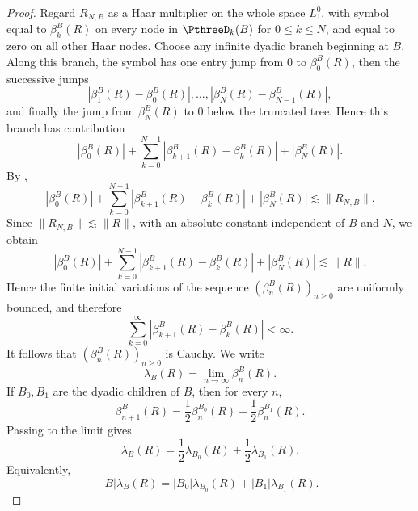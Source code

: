 \documentclass[11pt,reqno]{amsart}
\makeatletter
\theoremstyle{plain}
\theoremstyle{definition}
\newcounter{problempaper}
\newenvironment{problempaperbody}{%
  \setcounter{subsection}{0}%
  \setcounter{subsubsection}{0}%
  \setcounter{paragraph}{0}%
  \renewcommand{\thesubsection}{\arabic{subsection}}%
  \renewcommand{\thesubsubsection}{\thesubsection.\arabic{subsubsection}}%
  \renewcommand{\theparagraph}{\thesubsubsection.\arabic{paragraph}}%
  \let\problem@outersection\section
  \let\problem@outersubsection\subsection
  \let\problem@outersubsubsection\subsubsection
  \let\problem@outerparagraph\paragraph
  \let\section\problem@papersection
  \let\subsection\problem@papersubsection
  \let\subsubsection\problem@papersubsubsection
}{%
  \let\section\problem@outersection
  \let\subsection\problem@outersubsection
  \let\subsubsection\problem@outersubsubsection
  \let\paragraph\problem@outerparagraph
}
\newcommand{\problem@target}[2]{%
  \hypertarget{problem-\theproblempaper-#1-#2}{}%
}
\newcommand{\problem@paperheading}[3]{%
  \par\bigskip
  \problem@target{#1}{#2}%
  \noindent{\large\bfseries #2.\quad #3\par}%
  \nobreak\smallskip
}
\newcommand{\problem@papersubheading}[3]{%
  \par\medskip
  \problem@target{#1}{#2}%
  \noindent{\normalsize\bfseries #2.\quad #3\par}%
  \nobreak\smallskip
}
\newcommand{\problem@papersubsubheading}[3]{%
  \par\smallskip
  \problem@target{#1}{#2}%
  \noindent{\normalsize\itshape #2.\quad #3.\ }%
}
\def\problem@papersection{%
  \@ifstar{\problem@papersectionstar}{\problem@papersectionnostar}%
}
\def\problem@papersectionstar#1{%
  \par\bigskip\noindent{\large\bfseries #1\par}\nobreak\smallskip
}
\def\problem@papersectionnostar#1{%
  \refstepcounter{subsection}%
  \setcounter{subsubsection}{0}%
  \setcounter{paragraph}{0}%
  \problem@paperheading{section}{\thesubsection}{#1}%
  \problem@writecontentsline{section}{\thesubsection}{#1}%
}
\def\problem@papersubsection{%
  \@ifstar{\problem@papersubsectionstar}{\problem@papersubsectionnostar}%
}
\def\problem@papersubsectionstar#1{%
  \par\medskip\noindent{\normalsize\bfseries #1\par}\nobreak\smallskip
}
\def\problem@papersubsectionnostar#1{%
  \refstepcounter{subsubsection}%
  \setcounter{paragraph}{0}%
  \problem@papersubheading{subsection}{\thesubsubsection}{#1}%
  \problem@writecontentsline{subsection}{\thesubsubsection}{#1}%
}
\def\problem@papersubsubsection{%
  \@ifstar{\problem@papersubsubsectionstar}{\problem@papersubsubsectionnostar}%
}
\def\problem@papersubsubsectionstar#1{%
  \par\smallskip\noindent{\normalsize\itshape #1.\ }%
}
\def\problem@papersubsubsectionnostar#1{%
  \refstepcounter{paragraph}%
  \problem@papersubsubheading{subsubsection}{\theparagraph}{#1}%
  \problem@writecontentsline{subsubsection}{\theparagraph}{#1}%
}
\newcommand{\problem@writecontentsline}[3]{%
  \begingroup
  \protected@write\@auxout{}{%
    \string\problemcontentsentry{\theproblempaper}{#1}{#2}{#3}{\thepage}%
  }%
  \endgroup
}
\newcommand{\problemcontentsentry}[5]{%
  \@ifundefined{problemcontents@#1}{%
    \expandafter\gdef\csname problemcontents@#1\endcsname{}%
  }{}%
  \expandafter\g@addto@macro\csname problemcontents@#1\endcsname{%
    \problemcontentsline{#1}{#2}{#3}{#4}{#5}%
  }%
}
\newcommand{\problemcontentslink}[4]{%
  \hyperlink{problem-#1-#2-#3}{#4}%
}
\newcommand{\problemcontentsline}[5]{%
  \ifstrequal{#2}{section}{%
    \par\noindent
    \problemcontentslink{#1}{#2}{#3}{\makebox[2.5em][l]{#3}#4}%
    \nobreak\dotfill
    \problemcontentslink{#1}{#2}{#3}{#5}\par
  }{%
    \ifstrequal{#2}{subsection}{%
      \par\noindent\hspace*{1.5em}%
      \problemcontentslink{#1}{#2}{#3}{\makebox[3.5em][l]{#3}#4}%
      \nobreak\dotfill
      \problemcontentslink{#1}{#2}{#3}{#5}\par
    }{%
      \par\noindent\hspace*{3em}%
      \problemcontentslink{#1}{#2}{#3}{\makebox[4.5em][l]{#3}#4}%
      \nobreak\dotfill
      \problemcontentslink{#1}{#2}{#3}{#5}\par
    }%
  }%
}
\makeatother
\begin{document}
\begin{problempaperbody}
\begin{proof}
Regard $R_{N,B}$ as a Haar multiplier on the whole space $L_1^0$, with symbol equal to $\beta_k^B(R)$ on every node in $\PthreeD_k(B)$ for $0\leq k\leq N$, and equal to zero on all other Haar nodes. Choose any infinite dyadic branch beginning at $B$. Along this branch, the symbol has one entry jump from $0$ to $\beta_0^B(R)$, then the successive jumps
\begin{equation*}
        |\beta_1^B(R)-\beta_0^B(R)|,\ldots,|\beta_N^B(R)-\beta_{N-1}^B(R)|,
\end{equation*}
and finally the jump from $\beta_N^B(R)$ to $0$ below the truncated tree. Hence this branch has contribution
\begin{equation*}
        |\beta_0^B(R)|+\sum_{k=0}^{N-1}|\beta_{k+1}^B(R)-\beta_k^B(R)|+|\beta_N^B(R)|.
\end{equation*}
By ,
\begin{equation*}
        |\beta_0^B(R)|+\sum_{k=0}^{N-1}|\beta_{k+1}^B(R)-\beta_k^B(R)|+|\beta_N^B(R)|\lesssim \|R_{N,B}\|.
\end{equation*}
Since $\|R_{N,B}\|\lesssim\|R\|$, with an absolute constant independent of $B$ and $N$, we obtain
\begin{equation*}
        |\beta_0^B(R)|+\sum_{k=0}^{N-1}|\beta_{k+1}^B(R)-\beta_k^B(R)|+|\beta_N^B(R)|\lesssim\|R\|.
\end{equation*}
Hence the finite initial variations of the sequence $(\beta_n^B(R))_{n\geq 0}$ are uniformly bounded, and therefore
\begin{equation*}
        \sum_{k=0}^{\infty}|\beta_{k+1}^B(R)-\beta_k^B(R)|<\infty .
\end{equation*}
It follows that $(\beta_n^B(R))_{n\geq 0}$ is Cauchy. We write
\begin{equation*}
        \lambda_B(R)=\lim_{n\to\infty}\beta_n^B(R).
\end{equation*}
If $B_0,B_1$ are the dyadic children of $B$, then for every $n$,
\begin{equation*}
        \beta_{n+1}^B(R)=\frac12\beta_n^{B_0}(R)+\frac12\beta_n^{B_1}(R).
\end{equation*}
Passing to the limit gives
\begin{equation}
\label{p3:eq:lambda-dyadic-additivity}
        \lambda_B(R)=\frac12\lambda_{B_0}(R)+\frac12\lambda_{B_1}(R).
\end{equation}
Equivalently,
\begin{equation*}
        |B|\lambda_B(R)=|B_0|\lambda_{B_0}(R)+|B_1|\lambda_{B_1}(R).
\end{equation*}


\end{proof}
\end{problempaperbody}
\end{document}
